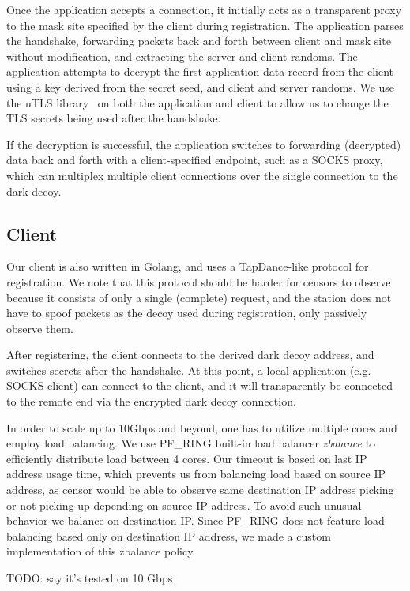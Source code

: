 \documentclass[letterpaper,twocolumn,10pt]{article}
\begin{document}
Once the application accepts a connection, it initially acts as a transparent
proxy to the mask site specified by the client during registration. The
application parses the handshake, forwarding packets back and forth between
client and mask site without modification, and extracting the server and client
randoms. The application attempts to decrypt the first application data record
from the client using a key derived from the secret seed, and client and server
randoms. We use the uTLS library~\cite{utls} on both the application and client
to allow us to change the TLS secrets being used after the handshake.

If the decryption is successful, the application switches to forwarding
(decrypted) data back and forth with a client-specified endpoint, such as a
SOCKS proxy, which can multiplex multiple client connections over the single
connection to the dark decoy.

\subsection{Client}

Our client is also written in Golang, and uses a TapDance-like protocol for
registration. We note that this protocol should be harder for censors to observe
because it consists of only a single (complete) request, and the station does
not have to spoof packets as the decoy used during registration, only passively
observe them.

After registering, the client connects to the derived dark decoy address, and
switches secrets after the handshake. At this point, a local application (e.g.
SOCKS client) can connect to the client, and it will transparently be connected to
the remote end via the encrypted dark decoy connection.

In order to scale up to 10Gbps and beyond,
one has to utilize multiple cores and employ load balancing.
We use PF\_RING built-in load balancer \emph{zbalance} to efficiently
distribute load between 4 cores.
Our timeout is based on last IP address usage time, which prevents us from
balancing load based on source IP address,
as censor would be able to observe
same destination IP address picking or not picking up
depending on source IP address.
To avoid such unusual behavior we balance on destination IP.
Since PF\_RING does not feature load balancing based only on destination
IP address, we made a custom implementation of this zbalance policy.

TODO: say it's tested on 10 Gbps
\end{document}

